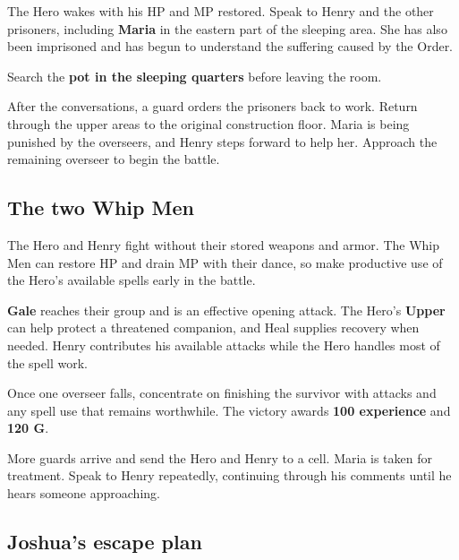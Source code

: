 
The Hero wakes with his HP and MP restored. Speak to Henry and the other
prisoners, including \textbf{Maria} in the eastern part of the sleeping
area. She has also been imprisoned and has begun to understand the
suffering caused by the Order.

Search the \textbf{pot in the sleeping quarters} before leaving the room.


After the conversations, a guard orders the prisoners back to work.
Return through the upper areas to the original construction floor.
Maria is being punished by the overseers, and Henry steps forward to
help her. Approach the remaining overseer to begin the battle.

\subsection*{The two Whip Men}

The Hero and Henry fight without their stored weapons and armor.
The Whip Men can restore HP and drain MP with their dance, so make
productive use of the Hero's available spells early in the battle.

\textbf{Gale} reaches their group and is an effective opening attack.
The Hero's \textbf{Upper} can help protect a threatened companion,
and Heal supplies recovery when needed. Henry contributes his available
attacks while the Hero handles most of the spell work.

Once one overseer falls, concentrate on finishing the survivor with
attacks and any spell use that remains worthwhile. The victory awards
\textbf{100 experience} and \textbf{120 G}.

More guards arrive and send the Hero and Henry to a cell. Maria is
taken for treatment. Speak to Henry repeatedly, continuing through
his comments until he hears someone approaching.

\subsection*{Joshua's escape plan}

